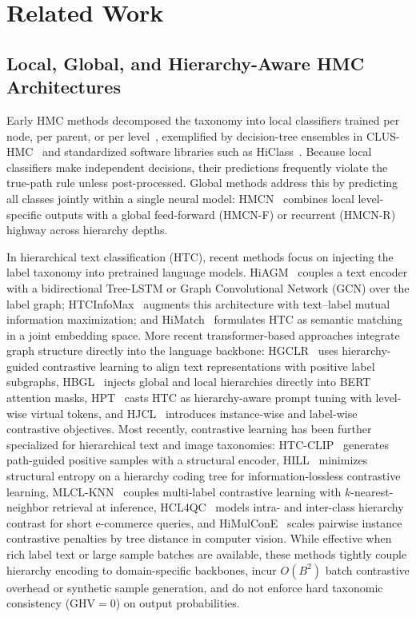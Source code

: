 \documentclass[preprint,12pt]{elsarticle}
\begin{document}
\section{Related Work}

\subsection{Local, Global, and Hierarchy-Aware HMC Architectures}

Early HMC methods decomposed the taxonomy into local classifiers trained per
node, per parent, or per level~\cite{silla2011hmc,cerri2014hmc}, exemplified
by decision-tree ensembles in CLUS-HMC~\cite{clus} and standardized software
libraries such as HiClass~\cite{miranda2023hiclass}. Because local classifiers
make independent decisions, their predictions frequently violate the true-path
rule unless post-processed. Global methods address this by predicting all
classes jointly within a single neural model: HMCN~\cite{weihs2018hmc}
combines local level-specific outputs with a global feed-forward (HMCN-F) or
recurrent (HMCN-R) highway across hierarchy depths.

In hierarchical text classification (HTC), recent methods focus on injecting
the label taxonomy into pretrained language models. HiAGM~\cite{zhou2020hiagm}
couples a text encoder with a bidirectional Tree-LSTM or Graph Convolutional
Network (GCN) over the label graph; HTCInfoMax~\cite{htcinfomax} augments
this architecture with text--label mutual information maximization; and
HiMatch~\cite{himatch} formulates HTC as semantic matching in a joint
embedding space. More recent transformer-based approaches integrate graph
structure directly into the language backbone: HGCLR~\cite{hgclr} uses
hierarchy-guided contrastive learning to align text representations with
positive label subgraphs, HBGL~\cite{jiang2022hbgl} injects global and local
hierarchies directly into BERT attention masks, HPT~\cite{hpt} casts HTC as
hierarchy-aware prompt tuning with level-wise virtual tokens, and
HJCL~\cite{u2023hjcl} introduces instance-wise and label-wise contrastive
objectives. Most recently, contrastive learning has been further specialized for
hierarchical text and image taxonomies: HTC-CLIP~\cite{htcclip2023} generates
path-guided positive samples with a structural encoder, HILL~\cite{hill2024}
minimizes structural entropy on a hierarchy coding tree for information-lossless
contrastive learning, MLCL-KNN~\cite{mlclknn2024} couples multi-label
contrastive learning with $k$-nearest-neighbor retrieval at inference,
HCL4QC~\cite{hcl4qc2023} models intra- and inter-class hierarchy contrast for
short e-commerce queries, and HiMulConE~\cite{himulcone2022} scales pairwise
instance contrastive penalties by tree distance in computer vision. While
effective when rich label text or large sample batches are available, these
methods tightly couple hierarchy encoding to domain-specific backbones, incur
$O(B^2)$ batch contrastive overhead or synthetic sample generation, and do not
enforce hard taxonomic consistency ($\text{GHV} = 0$) on output probabilities.
\end{document}
